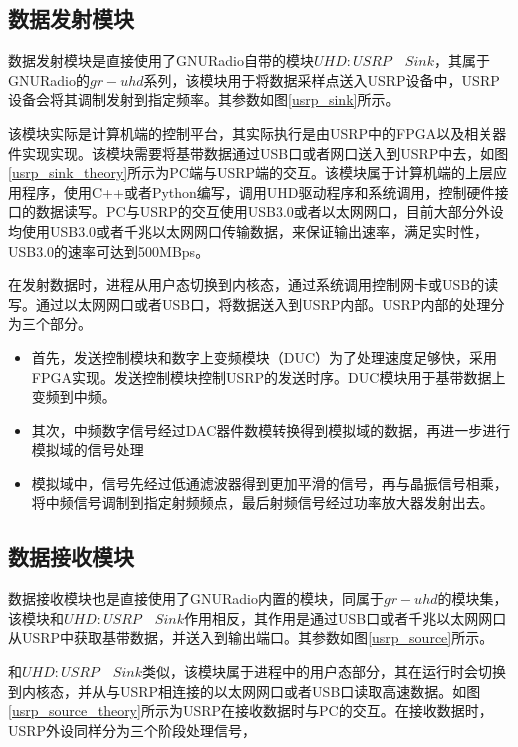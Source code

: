 \subsection{数据发射模块}


数据发射模块是直接使用了GNURadio自带的模块$UHD: USRP\quad Sink$，其属于GNURadio的$gr-uhd$系列，该模块用于将数据采样点送入USRP设备中，USRP设备会将其调制发射到指定频率。其参数如图\ref{usrp_sink}所示。

该模块实际是计算机端的控制平台，其实际执行是由USRP中的FPGA以及相关器件实现实现。该模块需要将基带数据通过USB口或者网口送入到USRP中去，如图\ref{usrp_sink_theory}所示为PC端与USRP端的交互。该模块属于计算机端的上层应用程序，使用C++或者Python编写，调用UHD驱动程序和系统调用，控制硬件接口的数据读写。PC与USRP的交互使用USB3.0或者以太网网口，目前大部分外设均使用USB3.0或者千兆以太网网口传输数据，来保证输出速率，满足实时性，USB3.0的速率可达到500MBps\cite{wei2016software}。

在发射数据时，进程从用户态切换到内核态，通过系统调用控制网卡或USB的读写。通过以太网网口或者USB口，将数据送入到USRP内部。USRP内部的处理分为三个部分。

\begin{itemize}
    \item 首先，发送控制模块和数字上变频模块（DUC）为了处理速度足够快，采用FPGA实现。发送控制模块控制USRP的发送时序。DUC模块用于基带数据上变频到中频\cite{xiong2015open}。
    \item 其次，中频数字信号经过DAC器件数模转换得到模拟域的数据，再进一步进行模拟域的信号处理
    \item 模拟域中，信号先经过低通滤波器得到更加平滑的信号，再与晶振信号相乘，将中频信号调制到指定射频频点，最后射频信号经过功率放大器发射出去。
\end{itemize}


\subsection{数据接收模块}

数据接收模块也是直接使用了GNURadio内置的模块，同属于$gr-uhd$的模块集，该模块和$UHD: USRP\quad Sink$作用相反，其作用是通过USB口或者千兆以太网网口从USRP中获取基带数据，并送入到输出端口。其参数如图\ref{usrp_source}所示。


和$UHD: USRP\quad Sink$类似，该模块属于进程中的用户态部分，其在运行时会切换到内核态，并从与USRP相连接的以太网网口或者USB口读取高速数据。如图\ref{usrp_source_theory}所示为USRP在接收数据时与PC的交互。在接收数据时，USRP外设同样分为三个阶段处理信号，

